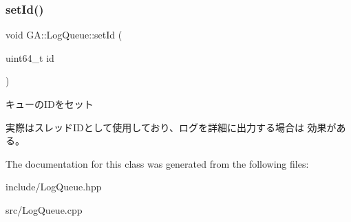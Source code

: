 \subsubsection{\texorpdfstring{setId()}{setId()}}
{\footnotesize\ttfamily void G\+A\+::\+Log\+Queue\+::set\+Id (\begin{DoxyParamCaption}\item[{uint64\+\_\+t}]{id }\end{DoxyParamCaption})}



キューの\+I\+Dをセット 

実際はスレッド\+I\+Dとして使用しており、ログを詳細に出力する場合は 効果がある。 

The documentation for this class was generated from the following files\+:\begin{DoxyCompactItemize}
\item 
include/Log\+Queue.\+hpp\item 
src/Log\+Queue.\+cpp\end{DoxyCompactItemize}
